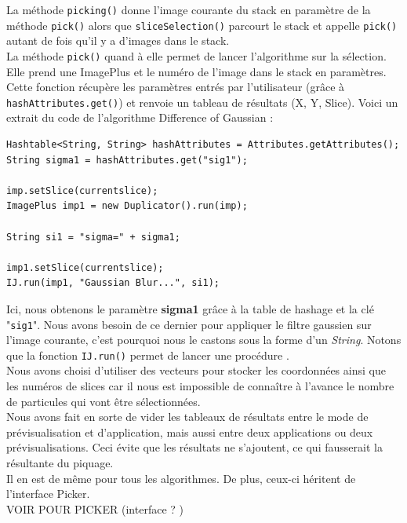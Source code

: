 La méthode \texttt{picking()} donne l'image courante du stack en paramètre de la méthode \texttt{pick()} alors que \texttt{sliceSelection()} parcourt le stack et appelle \texttt{pick()} autant de fois qu'il y a d'images dans le stack. \\

La méthode \texttt{pick()} quand à elle permet de lancer l'algorithme sur la sélection. Elle prend une ImagePlus et le numéro de l'image dans le stack en paramètres. Cette fonction récupère les paramètres entrés par l'utilisateur (grâce à \texttt{hashAttributes.get()}) et renvoie un tableau de résultats (X, Y, Slice). Voici un extrait du code de l'algorithme Difference of Gaussian :

\begin{small}
\begin{lstlisting}
Hashtable<String, String> hashAttributes = Attributes.getAttributes();
String sigma1 = hashAttributes.get("sig1");

imp.setSlice(currentslice);
ImagePlus imp1 = new Duplicator().run(imp);

String si1 = "sigma=" + sigma1;

imp1.setSlice(currentslice);
IJ.run(imp1, "Gaussian Blur...", si1);
\end{lstlisting}
\end{small}

Ici, nous obtenons le paramètre \textbf{sigma1} grâce à la table de hashage et la clé "\texttt{sig1}". Nous avons besoin de ce dernier pour appliquer le filtre gaussien sur l'image courante, c'est pourquoi nous le castons sous la forme d'un \emph{String}. Notons que la fonction \texttt{IJ.run()} permet de lancer une procédure \imj. \\
Nous avons choisi d'utiliser des vecteurs pour stocker les coordonnées ainsi que les numéros de slices car il nous est impossible de connaître à l'avance le nombre de particules qui vont être sélectionnées. \\
Nous avons fait en sorte de vider les tableaux de résultats entre le mode de prévisualisation et d'application, mais aussi entre deux applications ou deux prévisualisations. Ceci évite que les résultats ne s'ajoutent, ce qui fausserait la résultante du piquage. \\
Il en est de même pour tous les algorithmes. De plus, ceux-ci héritent de l'interface Picker. \\ 

VOIR POUR PICKER (interface ? ) \\

